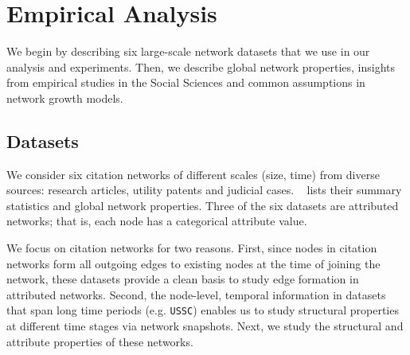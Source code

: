 
\section{Empirical Analysis}
\label{sec:Analysis}

We begin by describing six large-scale network datasets that we
use in our analysis and experiments. Then, we describe global network properties,
insights from empirical studies in the Social Sciences and common assumptions in
network growth models.

\subsection{Datasets}
\label{sec:Datasets}

We consider six citation networks of different scales (size, time) from diverse
sources: research articles, utility patents and judicial cases. ~ lists their
summary statistics and global network properties.  Three of the six datasets are attributed networks;
that is, each node has a categorical attribute value.

We focus on citation networks for two reasons. First, since nodes in citation networks form
all outgoing edges to existing nodes at the time of joining the network,
these datasets provide a clean basis to study edge formation in
attributed networks. Second, the node-level, temporal information in datasets that span long time periods (e.g. \texttt{USSC})
enables us to study structural properties at different time stages via network snapshots.
Next, we study the structural and attribute properties of these networks.

